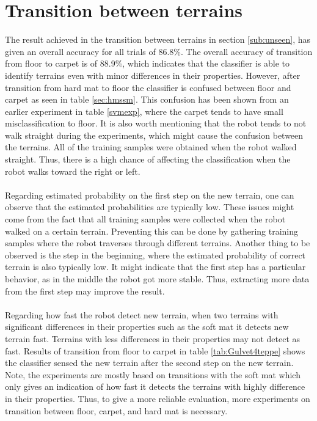 \documentclass[USenglish]{ifimaster}  %
\begin{document}
\section{Transition between terrains}
The result achieved in the transition between terrains in section \ref{sub:unseen}, has given an overall accuracy for all trials of 86.8\%. The overall accuracy of transition from floor to carpet is of 88.9\%, which indicates that the classifier is able to identify terrains even with minor differences in their properties. However, after transition from hard mat to floor the classifier is confused between floor and carpet as seen in table \ref{sec:hmssm}. This confusion has been shown from an earlier experiment in table \ref{svmexp}, where the carpet tends to have small misclassification to floor. It is also worth mentioning that the robot tends to not walk straight during the experiments, which might cause the confusion between the terrains. All of the training samples were obtained when the robot walked straight. Thus, there is a high chance of affecting the classification when the robot walks toward the right or left. 
\\
\\
Regarding estimated probability on the first step on the new terrain, one can observe that the estimated probabilities are typically low. These issues might come from the fact that all training samples were collected when the robot walked on a certain terrain. Preventing this can be done by gathering training samples where the robot traverses through different terrains. Another thing to be observed is the step in the beginning, where the estimated probability of correct terrain is also typically low. It might indicate that the first step has a particular behavior, as in the middle the robot got more stable. Thus, extracting more data from the first step may improve the result.
\\
\\
Regarding how fast the robot detect new terrain, when two terrains with significant differences in their properties such as the soft mat it detects new terrain fast. Terrains with less differences in their properties may not detect as fast. Results of transition from floor to carpet in table \ref{tab:Gulvet4teppe} shows the classifier sensed the new terrain after the second step on the new terrain. Note, the experiments are mostly based on transitions with the soft mat which only gives an indication of how fast it detects the terrains with highly difference in their properties. Thus, to give a more reliable evaluation, more experiments on transition between floor, carpet, and hard mat is necessary.
	
\end{document}
